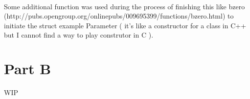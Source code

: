 \documentclass[a4paper]{article}
\begin{document}
\paragraph{} 
Some additional function was used during the process of finishing this like bzero (http://pubs.opengroup.org/onlinepubs/009695399/functions/bzero.html) to initiate the struct example Parameter ( it's like a constructor for a class in C++ but I cannot find a way to play construtor in C ).



\newpage
\section{Part B}

\paragraph{}
WIP
\newpage





\clearpage
\end{document}
